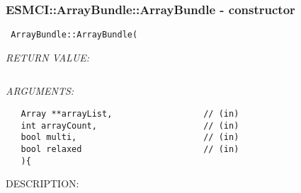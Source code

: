  
\setlength{\oldparskip}{\parskip}
\setlength{\parskip}{1.5ex}
\setlength{\oldparindent}{\parindent}
\setlength{\parindent}{0pt}
\setlength{\oldbaselineskip}{\baselineskip}
\setlength{\baselineskip}{11pt}
 
\def\bv{\begin{verbatim}}
\def\ev{\end{verbatim}}
\def\be{\begin{equation}}
\def\ee{\end{equation}}
\def\bea{\begin{eqnarray}}
\def\eea{\end{eqnarray}}
\def\bi{\begin{itemize}}
\def\ei{\end{itemize}}
\def\bn{\begin{enumerate}}
\def\en{\end{enumerate}}
\def\bd{\begin{description}}
\def\ed{\end{description}}
\def\({\left (}
\def\){\right )}
\def\[{\left [}
\def\]{\right ]}
\def\<{\left  \langle}
\def\>{\right \rangle}
\def\cI{{\cal I}}
\def\diag{\mathop{\rm diag}}
\def\tr{\mathop{\rm tr}}


 
\subsubsection [ESMCI::ArrayBundle::ArrayBundle] {ESMCI::ArrayBundle::ArrayBundle - constructor}


  
\begin{verbatim} ArrayBundle::ArrayBundle(\end{verbatim}{\em RETURN VALUE:}
\begin{verbatim}      \end{verbatim}{\em ARGUMENTS:}
\begin{verbatim}   Array **arrayList,                  // (in)
   int arrayCount,                     // (in)
   bool multi,                         // (in)
   bool relaxed                        // (in)
   ){\end{verbatim}
{\sf DESCRIPTION:\\ }


